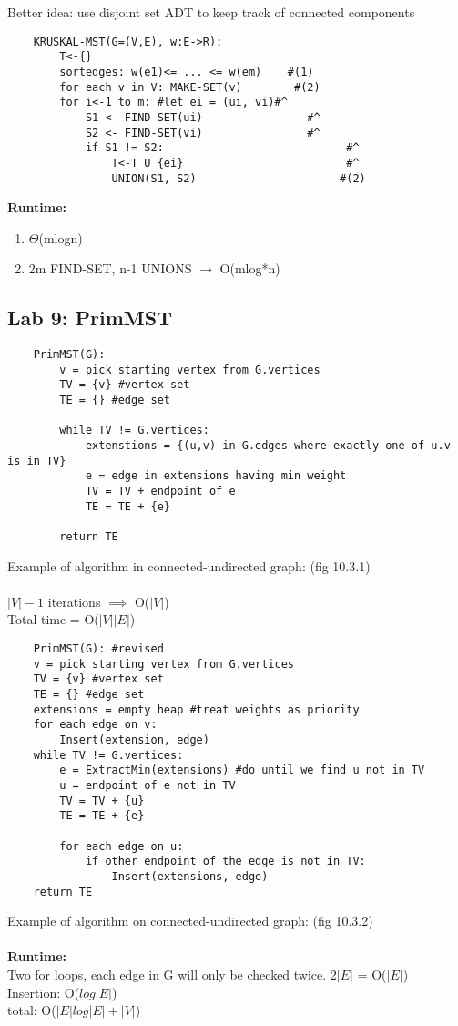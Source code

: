 \documentclass{article}
\begin{document}
	Better idea: use disjoint set ADT to keep track of connected components
	\begin{lstlisting}
	KRUSKAL-MST(G=(V,E), w:E->R):
		T<-{}
		sortedges: w(e1)<= ... <= w(em)    #(1)
		for each v in V: MAKE-SET(v)        #(2)
		for i<-1 to m: #let ei = (ui, vi)#^ 
			S1 <- FIND-SET(ui)			      #^
			S2 <- FIND-SET(vi)			      #^
			if S1 != S2:				 			#^
				T<-T U {ei}				 			#^
				UNION(S1, S2)			 		   #(2)
	\end{lstlisting}
	\textbf{Runtime:} \begin{enumerate}
		\item $\Theta$(mlogn)
		\item 2m FIND-SET, n-1 UNIONS $\rightarrow$ O(mlog*n)\\
	\end{enumerate}
	\subsection{Lab 9: PrimMST}
	\begin{lstlisting}
	PrimMST(G):
		v = pick starting vertex from G.vertices
		TV = {v} #vertex set
		TE = {} #edge set
		
		while TV != G.vertices:
			extenstions = {(u,v) in G.edges where exactly one of u.v is in TV}
			e = edge in extensions having min weight
			TV = TV + endpoint of e
			TE = TE + {e}
		
		return TE
	\end{lstlisting}
	Example of algorithm in connected-undirected graph: (fig 10.3.1)\\\\
	$|V| - 1$ iterations $\implies$ O($|V|$)\\
	Total time = O($|V||E|$)\\
	\begin{lstlisting}
	PrimMST(G): #revised
	v = pick starting vertex from G.vertices
	TV = {v} #vertex set
	TE = {} #edge set
	extensions = empty heap #treat weights as priority
	for each edge on v:
		Insert(extension, edge)
	while TV != G.vertices:
		e = ExtractMin(extensions) #do until we find u not in TV
		u = endpoint of e not in TV
		TV = TV + {u}
		TE = TE + {e}
		
		for each edge on u:
			if other endpoint of the edge is not in TV:
				Insert(extensions, edge) 
	return TE
	\end{lstlisting}
	Example of algorithm on connected-undirected graph: (fig 10.3.2)\\\\
	\textbf{Runtime:\\}
	Two for loops, each edge in G will only be checked twice. 2$|E|$ = O($|E|$)\\
	Insertion: O($log|E|$)\\
	total: O($|E|log|E| + |V|$)\\\\
	
\end{document}
